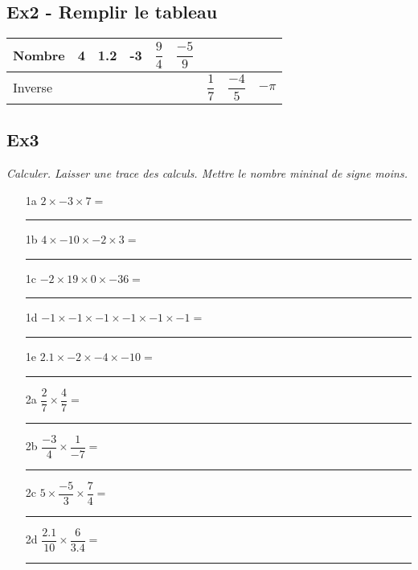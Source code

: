 \documentclass[12pt]{article}
\begin{document}

\subsection*{Ex2 - Remplir le tableau}

\begin{center}
  \begin{tabular}{| l || c | c | c | c | c | c | c | c | }
    \hline
    Nombre & 4                 & 1.2               & -3               & $\dfrac{9}{4}$   & $\dfrac{-5}{9}$  & \phantom{azerty} & \phantom{azerty} & \phantom{azerty}  \\
    \hline
    Inverse & \phantom{azerty}  & \phantom{azerty}  & \phantom{azerty} & \phantom{azerty} & \phantom{azerty} & $\dfrac{1}{7}$   & $\dfrac{-4}{5}$  & $-\pi$ \\
    \hline
  \end{tabular}
\end{center}


\subsection*{Ex3}
\textit{Calculer. Laisser une trace des calculs. Mettre le nombre mininal de signe moins.}

\begin{multicols}{2}
  
\begin{enumerate}
\item[1a] $2 \times  -3 \times 7 = $\\
  \rule{\linewidth}{0.5pt}
\item[1b] $4 \times  -10 \times -2 \times 3 = $\\
  \rule{\linewidth}{0.5pt}
\item[1c] $-2 \times 19 \times 0 \times -36 = $\\
  \rule{\linewidth}{0.5pt}
\item[1d] $-1 \times -1 \times -1 \times -1 \times -1  \times -1 = $\\
  \rule{\linewidth}{0.5pt}
\item[1e] $2.1 \times -2 \times -4 \times -10 = $\\
  \rule{\linewidth}{0.5pt}   
\end{enumerate}


\begin{enumerate}
\item[2a] $ \dfrac{2}{7} \times \dfrac{4}{7} = $\\
  \rule{\linewidth}{0.5pt}
\item[2b] $ \dfrac{-3}{4} \times \dfrac{1}{-7} = $\\
  \rule{\linewidth}{0.5pt}
\item[2c] $ 5 \times \dfrac{-5}{3} \times \dfrac{7}{4} = $\\
    \rule{\linewidth}{0.5pt}
\item[2d] $ \dfrac{2.1}{10} \times \dfrac{6}{3.4} = $\\
  \rule{\linewidth}{0.5pt}
\end{enumerate}

\end{multicols}
\end{document}
